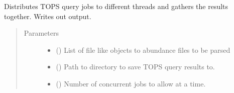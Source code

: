 \documentclass[letterpaper,10pt,english]{sphinxmanual}
\begin{document}
\begin{fulllineitems}
\label{\detokenize{pyTOPSScrape.api:pyTOPSScrape.api.api.TOPS_query_async_distributor}}
\sphinxAtStartPar
Distributes TOPS query jobs to different threads and gathers the results
together. Writes out output.
\begin{quote}\begin{description}
\item[{Parameters}] \leavevmode\begin{itemize}
\item {} 
\sphinxAtStartPar
{} () \textendash{} List of file like objects to abundance files to be parsed

\item {} 
\sphinxAtStartPar
{} () \textendash{} Path to directory to save TOPS query results to.

\item {} 
\sphinxAtStartPar
{} (\sphinxstyleliteralemphasis{\sphinxupquote{, }}) \textendash{} Number of concurrent jobs to allow at a time.

\end{itemize}

\end{description}\end{quote}

\end{fulllineitems}

\end{document}
